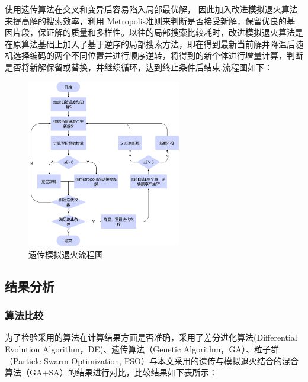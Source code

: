 \documentclass{whutmod}
\begin{document}
\begin{spacing}{1.2}
 使用遗传算法在交叉和变异后容易陷入局部最优解\cite{8}， 因此加入改进模拟退火算法来提高解的搜索效率，利用 Metropolis准则来判断是否接受新解，保留优良的基因片段，保证解的质量和多样性。以往的局部搜索比较耗时，改进模拟退火算法是在原算法基础上加入了基于逆序的局部搜索方法，即在得到最新当前解并降温后随机选择编码的两个不同位置并进行顺序逆转，将得到的新个体进行增量计算，判断是否将新解保留或替换，并继续循环，达到终止条件后结束,流程图如下：

  \begin{figure}[H]
		\centering
		\includegraphics[width=0.6\textwidth]{问题一算法.jpg}
		\caption{遗传模拟退火流程图}
	\end{figure}
 





	
	
	
	
	

    \subsection{结果分析}
    \subsubsection{算法比较}
    为了检验采用的算法在计算结果方面是否准确，采用了差分进化算法(Differential Evolution Algorithm，DE)、遗传算法（Genetic Algorithm，GA）、粒子群（Particle Swarm Optimization, PSO）\cite{7}与本文采用的遗传与模拟退火结合的混合算法（GA+SA）的结果进行对比，比较结果如下表所示：
    

\end{spacing}
\end{document}
